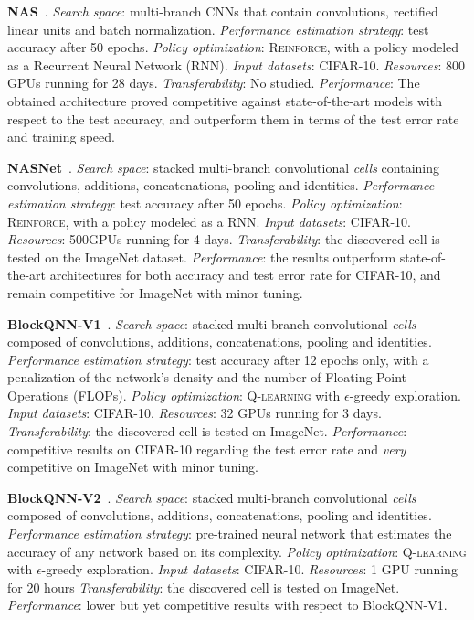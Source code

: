 \textbf{NAS}~\citep{ZophNAS1}. \emph{Search space}: multi-branch CNNs that contain convolutions, rectified linear units and batch normalization. \emph{Performance estimation strategy}: test accuracy after 50 epochs. \emph{Policy optimization}: \textsc{Reinforce}, with a policy modeled as a Recurrent Neural Network (RNN). \emph{Input datasets}: CIFAR-10. \emph{Resources}: 800 GPUs running for 28 days. \emph{Transferability}: No studied. \emph{Performance}: The obtained architecture proved competitive against state-of-the-art models with respect to the test accuracy, and outperform them in terms of the test error rate and training speed.


\textbf{NASNet}~\citep{ZophNAS2}. \emph{Search space}: stacked multi-branch convolutional \textit{cells} containing convolutions, additions, concatenations, pooling and identities. \emph{Performance estimation strategy}: test accuracy after 50 epochs. \emph{Policy optimization}: \textsc{Reinforce}, with a policy modeled as a RNN. \emph{Input datasets}: CIFAR-10. \emph{Resources}: 500GPUs running for 4 days. \emph{Transferability}: the discovered cell is tested on the ImageNet dataset. \emph{Performance}: the results outperform state-of-the-art architectures for both accuracy and test error rate for CIFAR-10, and remain competitive for ImageNet with minor tuning.



\textbf{BlockQNN-V1}~\citep{BlockQNN}. \emph{Search space}: stacked multi-branch convolutional \textit{cells} composed of convolutions, additions, concatenations, pooling and identities. \emph{Performance estimation strategy}: test accuracy after 12 epochs only, with a penalization of the network's density and the number of Floating Point Operations (FLOPs). \emph{Policy optimization}: \textsc{Q-learning} with $\epsilon$-greedy exploration. \emph{Input datasets}: CIFAR-10. \emph{Resources}: 32 GPUs running for 3 days. \emph{Transferability}: the discovered cell is tested on ImageNet. \emph{Performance}: competitive results on CIFAR-10 regarding the test error rate and \textit{very} competitive on ImageNet with minor tuning.
 
\textbf{BlockQNN-V2}~\citep{BlockQNN}. \emph{Search space}: stacked multi-branch convolutional \textit{cells} composed of convolutions, additions, concatenations, pooling and identities. \emph{Performance estimation strategy}: pre-trained neural network that estimates the accuracy of any network based on its complexity. \emph{Policy optimization}: \textsc{Q-learning} with $\epsilon$-greedy exploration. \emph{Input datasets}: CIFAR-10. \emph{Resources}: 1 GPU running for 20 hours \emph{Transferability}: the discovered cell is tested on ImageNet. \emph{Performance}: lower but yet competitive results with respect to BlockQNN-V1.

